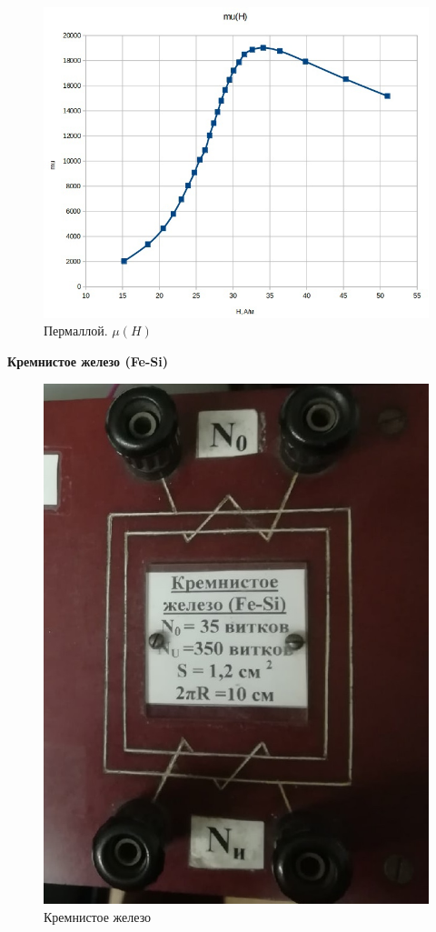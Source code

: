 \documentclass[a4paper,12pt]{article} %
\begin{document}
\begin{figure}[h!]
	\centering
	\includegraphics[scale=0.47]{Pictures/ПЕРМАЛЛОЙ_mu(H).jpg}
	\caption{Пермаллой. $\mu (H)$}
\end{figure}



\newpage
\textbf{{\large Кремнистое железо (Fe-Si)}}
\begin{figure}[h!]
	\centering
	\includegraphics[scale=0.6]{Pictures/КРМЖЛЗ.jpg}
	\caption{Кремнистое железо}
\end{figure}
\end{document}
